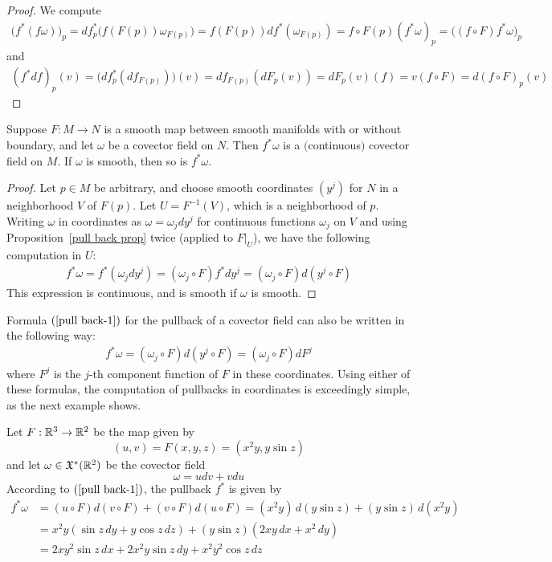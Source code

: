 \begin{proof}
We compute
\begin{align*}
\big(f^*(f\omega)\big)_p=df^*_p\big(f(F(p))\omega_{F(p)}\big)=f(F(p))df^*(\omega_{F(p)})=f\circ F(p)(f^*\omega)_p=\big((f\circ F)f^*\omega\big)_p
\end{align*}
and
\begin{align*}
(f^*df)_p(v)=\big(df^*_p(df_{F(p)})\big)(v)=df_{F(p)}(dF_p(v))=dF_p(v)(f)=v(f\circ F)=d(f\circ F)_p(v)
\end{align*}
\end{proof}
\begin{proposition}
Suppose $F:M\to N$ is a smooth map between smooth manifolds with or without boundary, and let $\omega$ be a covector field on $N$. Then $f^*\omega$ is a
$($continuous$)$ covector field on $M$. If $\omega$ is smooth, then so is $f^*\omega$.
\end{proposition}
\begin{proof}
Let $p\in M$ be arbitrary, and choose smooth coordinates $(y^j)$ for $N$ in a
neighborhood $V$ of $F(p)$. Let $U=F^{-1}(V)$, which is a neighborhood of $p$. Writing $\omega$ in coordinates as $\omega=\omega_jdy^j$ for continuous functions $\omega_j$ on $V$ and using Proposition~\ref{pull back prop} twice (applied to $F|_U$), we have the following computation in $U$:
\begin{align}\label{pull back-1}
f^*\omega=f^*(\omega_jdy^j)=(\omega_j\circ F)f^*dy^j=(\omega_j\circ F)d(y^j\circ F)
\end{align}
This expression is continuous, and is smooth if $\omega$ is smooth.
\end{proof}
Formula $(\ref{pull back-1})$ for the pullback of a covector field can also be written in the following way:
\begin{align}\label{pull back-2}
f^*\omega=(\omega_j\circ F)d(y^j\circ F)=(\omega_j\circ F)dF^j
\end{align}
where $F^j$ is the $j$-th component function of $F$ in these coordinates. Using either of these formulas, the computation of pullbacks in coordinates is exceedingly simple, as the next example shows.
\begin{example}
Let $F:\mathbb{R}^3\to\mathbb{R}^2$ be the map given by
\[(u,v)=F(x,y,z)=(x^2y,y\sin z)\]
and let $\omega\in\mathfrak{X}^*(\mathbb{R}^2)$ be the covector field
\[\omega=udv+vdu\]
According to $(\ref{pull back-1})$, the pullback $f^*$ is given by
\begin{align*}
f^*\omega&=(u\circ F)d(v\circ F)+(v\circ F)d(u\circ F)=(x^2y)\,d(y\sin z)+(y\sin z)\,d(x^2y)\\
&=x^2y(\sin z\,dy+y\cos z\,dz)+(y\sin z)(2xy\,dx+x^2\,dy)\\
&=2xy^2\sin z\,dx+2x^2y\sin z\,dy+x^2y^2\cos z\,dz
\end{align*}
\end{example}
